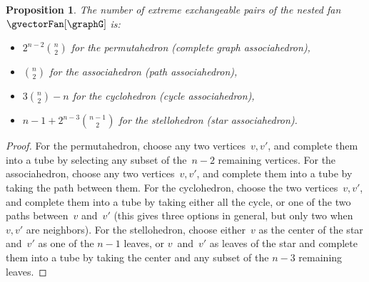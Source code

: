 \documentclass{amsart}
\newtheorem{proposition}[theorem]{Proposition}
\theoremstyle{definition}
\newtheorem{example}[theorem]{Example}
\begin{document}
\begin{proposition}
The number of extreme exchangeable pairs of the nested fan~$\gvectorFan[\graphG]$ is:
\begin{itemize}
\item $2^{n-2}\binom{n}{2}$ for the permutahedron (complete graph associahedron),
\item $\binom{n}{2}$ for the associahedron (path associahedron),
\item $3\binom{n}{2} - n$ for the cyclohedron (cycle associahedron),
\item $n-1+2^{n-3}\binom{n-1}{2}$ for the stellohedron (star associahedron).
\end{itemize}
\end{proposition}

\begin{proof}
For the permutahedron, choose any two vertices~$v,v'$, and complete them into a tube by selecting any subset of the~$n-2$ remaining vertices.
For the associahedron, choose any two vertices~$v,v'$, and complete them into a tube by taking the path between them.
For the cyclohedron, choose the two vertices~$v,v'$, and complete them into a tube by taking either all the cycle, or one of the two paths between~$v$ and~$v'$ (this gives three options in general, but only two when~$v,v'$ are neighbors).
For the stellohedron, choose either~$v$ as the center of the star and~$v'$ as one of the $n-1$ leaves, or $v$~and~$v'$ as leaves of the star and complete them into a tube by taking the center and any subset of the $n-3$ remaining leaves.
\end{proof}

\end{document}
